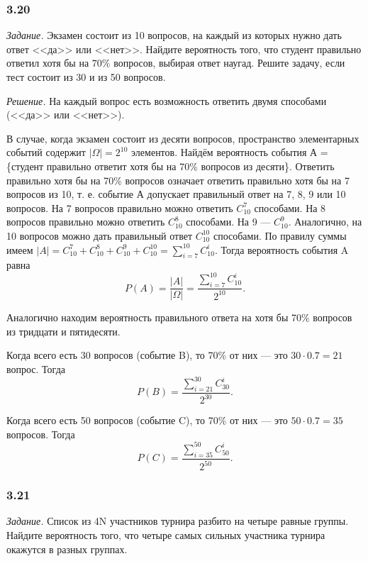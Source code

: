 \subsubsection*{3.20}

\textit{Задание.} Экзамен состоит из 10 вопросов, на каждый из которых нужно дать ответ <<да>> или <<нет>>.
Найдите вероятность того, что студент правильно ответил хотя бы на $ 70 \% $ вопросов, выбирая ответ наугад.
Решите задачу, если тест состоит из 30 и из 50 вопросов.

\textit{Решение.} На каждый вопрос есть возможность ответить двумя способами (<<да>> или <<нет>>).

В случае, когда экзамен состоит из десяти вопросов, пространство элементарных событий содержит $ | \Omega | = 2^{10} $ элементов.
Найдём вероятность события А = \{студент правильно ответит хотя бы на 70\% вопросов из десяти\}.
Ответить правильно хотя бы на 70\% вопросов означает ответить правильно хотя бы на 7 вопросов из 10, т. е. событие А допускает правильный ответ на 7, 8, 9 или 10 вопросов.
На 7 вопросов правильно можно ответить $ C_{10}^7 $ способами.
На 8 вопросов правильно можно ответить $ C_{10}^8 $ способами.
На 9 --- $ C_{10}^9 $.
Аналогично, на 10 вопросов можно дать правильный ответ $ C_{10}^{10} $ способами.
По правилу суммы имеем $ |A| = C_{10}^7 + C_{10}^8 + C_{10}^9 + C_{10}^{10} = \sum \limits_{i=7}^{10} C_{10}^i $.
Тогда вероятность события A равна
$$ P \left( A \right) =
\frac{|A|}{| \Omega |} =
\frac{ \sum \limits_{i=7}^{10} C_{10}^i}{2^{10}}.$$

Аналогично находим вероятность правильного ответа на хотя бы 70\% вопросов из тридцати и пятидесяти.

Когда всего есть 30 вопросов (событие B), то 70\% от них --- это $ 30 \cdot 0.7 = 21$ вопрос.
Тогда
$$ P \left( B \right) =
\frac{ \sum \limits_{i=21}^{30} C_{30}^i}{2^{30}}.$$

Когда всего есть 50 вопросов (событие C), то 70\% от них --- это $ 50 \cdot 0.7 = 35$ вопросов.
Тогда
$$ P \left( C \right) =
\frac{ \sum \limits_{i=35}^{50} C_{50}^i}{2^{50}}.$$

\subsubsection*{3.21}

\textit{Задание.} Список из 4N участников турнира разбито на четыре равные группы.
Найдите вероятность того, что четыре самых сильных участника турнира окажутся в разных группах. 

